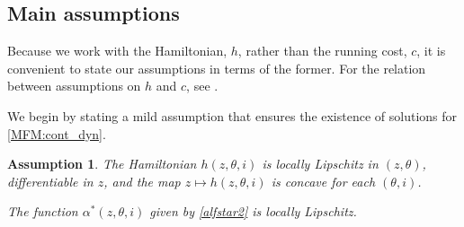 \documentclass[12pt]{amsart}
\newcommand{\1}{{\chi}}
\newtheorem{hyp}{Assumption}
\theoremstyle{definition}
\begin{document}
\subsection{Main assumptions} 
\label{sub:the_monotonicity_condition}

Because we work with the Hamiltonian, $h$, rather than the running cost, $c$, it is convenient to state our assumptions in terms of the former. 
For the relation between assumptions on $h$ and $c$, see \cite{GMS2}.

We begin by stating a mild assumption that ensures the existence of solutions 
for \eqref{MFM:cont_dyn}.
\begin{hyp}
\label{A1}
The Hamiltonian $h(z,\theta, i)$ is locally Lipschitz in $(z, \theta)$,
differentiable in $z$, 
and the map $z\mapsto h(z, \theta, i)$ is concave for each $(\theta, i)$. 

The function $\alpha^*(z, \theta, i)$ given by \eqref{alfstar2} is locally Lipschitz.
\end{hyp}       
\end{document}
